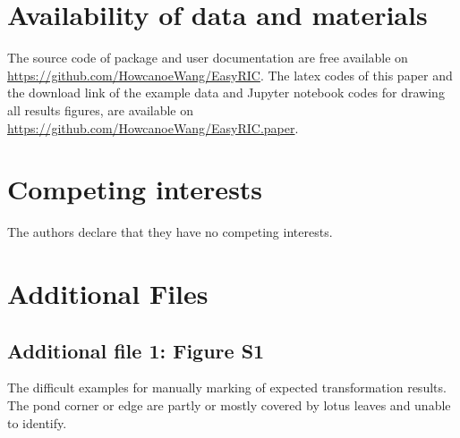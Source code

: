 \documentclass{configs/bmcart}
\begin{document}
\begin{backmatter}
\section*{Availability of data and materials}
The source code of package and user documentation are free available on \url{https://github.com/HowcanoeWang/EasyRIC}. The latex codes of this paper and the download link of the example data and Jupyter notebook codes for drawing all results figures, are available on \url{https://github.com/HowcanoeWang/EasyRIC.paper}.

\section*{Competing interests}
The authors declare that they have no competing interests.






\section*{Additional Files}

\subsection*{Additional file 1: Figure S1}
The difficult examples for manually marking of expected transformation results. The pond corner or edge are partly or mostly covered by lotus leaves and unable to identify.


\end{backmatter}
\end{document}

